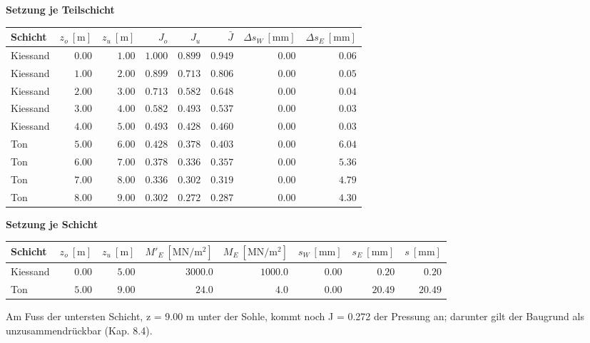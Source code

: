 \documentclass[11pt,a4paper]{article}
\begin{document}
\noindent\textbf{Setzung je Teilschicht}
\begin{longtable}{lrrrrrrr}
\hline
Schicht & $z_o\ [\mathrm{m}]$ & $z_u\ [\mathrm{m}]$ & $J_o$ & $J_u$ & $\bar{J}$ & $\Delta s_W\ [\mathrm{mm}]$ & $\Delta s_E\ [\mathrm{mm}]$ \\
\hline
\endhead
Kiessand & $0.00$ & $1.00$ & $1.000$ & $0.899$ & $0.949$ & $0.00$ & $0.06$ \\
Kiessand & $1.00$ & $2.00$ & $0.899$ & $0.713$ & $0.806$ & $0.00$ & $0.05$ \\
Kiessand & $2.00$ & $3.00$ & $0.713$ & $0.582$ & $0.648$ & $0.00$ & $0.04$ \\
Kiessand & $3.00$ & $4.00$ & $0.582$ & $0.493$ & $0.537$ & $0.00$ & $0.03$ \\
Kiessand & $4.00$ & $5.00$ & $0.493$ & $0.428$ & $0.460$ & $0.00$ & $0.03$ \\
Ton & $5.00$ & $6.00$ & $0.428$ & $0.378$ & $0.403$ & $0.00$ & $6.04$ \\
Ton & $6.00$ & $7.00$ & $0.378$ & $0.336$ & $0.357$ & $0.00$ & $5.36$ \\
Ton & $7.00$ & $8.00$ & $0.336$ & $0.302$ & $0.319$ & $0.00$ & $4.79$ \\
Ton & $8.00$ & $9.00$ & $0.302$ & $0.272$ & $0.287$ & $0.00$ & $4.30$ \\
\hline
\end{longtable}
\noindent\textbf{Setzung je Schicht}
\begin{longtable}{lrrrrrrr}
\hline
Schicht & $z_o\ [\mathrm{m}]$ & $z_u\ [\mathrm{m}]$ & $M'_E\ [\mathrm{MN}/\mathrm{m}^{2}]$ & $M_E\ [\mathrm{MN}/\mathrm{m}^{2}]$ & $s_W\ [\mathrm{mm}]$ & $s_E\ [\mathrm{mm}]$ & $s\ [\mathrm{mm}]$ \\
\hline
\endhead
Kiessand & $0.00$ & $5.00$ & $3000.0$ & $1000.0$ & $0.00$ & $0.20$ & $0.20$ \\
Ton & $5.00$ & $9.00$ & $24.0$ & $4.0$ & $0.00$ & $20.49$ & $20.49$ \\
\hline
\end{longtable}
Am Fuss der untersten Schicht, z = 9.00 m unter der Sohle, kommt noch J = 0.272 der Pressung an; darunter gilt der Baugrund als unzusammendrückbar (Kap. 8.4).
\end{document}

